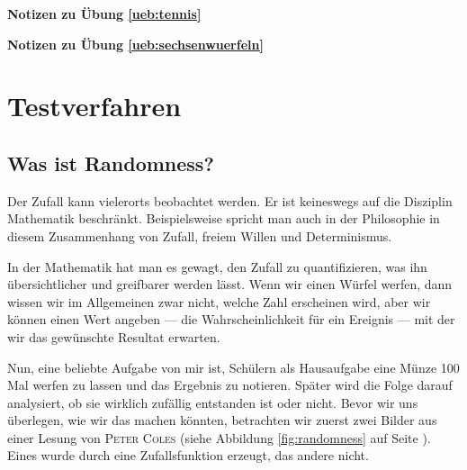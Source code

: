 \documentclass[%
<<<<<<< Updated upstream
11pt,%
twoside,%
titlepage,%
german,%
=======
11pt,%
twoside,%
titlepage,%
swissgerman,%
>>>>>>> Stashed changes
headsepline%
]{scrartcl}
\newcommand{\faReturnGray}{\textcolor{gray}{\faMailReply}} %
\theoremstyle{definition}
\theoremstyle{plain}
\newcommand{\concatueb}[1]{ueb:#1}%
\newcommand{\concatlsg}[1]{lsg:#1}%
\newenvironment{lsg}[1]{%
    \par\noindent\textbf{Notizen zu Übung \ref{\concatueb{#1}}}\label{\concatlsg{#1}}
    \hfill\hyperref[\concatueb{#1}]{\faReturnGray}\par %
}{%
    \par%
}
\newcommand{\concatueb}[1]{ueb:#1}%
\newcommand{\concatlsg}[1]{lsg:#1}%
\newenvironment{lsg}[1]{%
    \par\noindent\textbf{Notizen zu Übung \ref{\concatueb{#1}}.}%
    \label{\concatlsg{#1}}
}{%
    \par%
}
\begin{document}
\begin{lsg}{tennis}
\begin{lsg}{sechsenwuerfeln}
\begin{center}
\begin{tikzpicture}[x=0.8cm, y=15cm]
\end{tikzpicture}
\end{center}
\end{lsg}

\clearpage

\section{Testverfahren}

\subsection{Was ist Randomness?}
Der Zufall kann vielerorts beobachtet werden. Er ist keineswegs auf die Disziplin Mathematik beschränkt. Beispielsweise spricht man auch in der Philosophie in diesem Zusammenhang von Zufall, freiem Willen und Determinismus.

In der Mathematik hat man es gewagt, den Zufall zu quantifizieren, was ihn über\-sich\-tli\-cher und greifbarer werden lässt. Wenn wir einen Würfel werfen, dann wissen wir im Allgemeinen zwar nicht, welche Zahl erscheinen wird, aber wir können einen Wert angeben --- die Wahrscheinlichkeit für ein Ereignis --- mit der wir das gewünschte Resultat erwarten.

Nun, eine beliebte Aufgabe von mir ist, Schülern als Hausaufgabe eine Münze 100 Mal werfen zu lassen und das Ergebnis zu notieren. Später wird die Folge darauf analysiert, ob sie wirklich zufällig entstanden ist oder nicht. Bevor wir uns überlegen, wie wir das machen könnten, betrachten wir zuerst zwei Bilder aus einer Lesung von \textsc{Peter Coles} (siehe Abbildung \ref{fig:randomness} auf Seite \pageref{fig:randomness}). Eines wurde durch eine Zufallsfunktion erzeugt, das andere nicht.  


\end{lsg}
\end{document}
